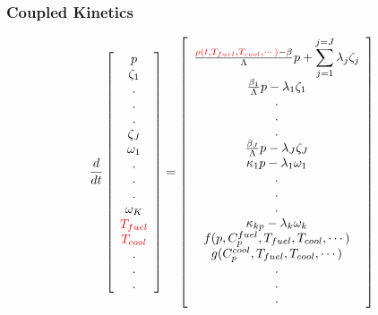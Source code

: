 \begin{frame}[fragile]
{  }
\end{frame}


\begin{frame}[fragile]
  \frametitle{Coupled Kinetics}
  \footnotesize{
\begin{equation} 
  \frac{d}{dt}\left[
    \begin{array}{c}
      p\\
      \zeta_1\\
      .\\
      .\\
      .\\
      \zeta_J\\
      \omega_1\\
      .\\
      .\\
      .\\
      \omega_K\\
      \textcolor{red}{T_{fuel}}\\
      \textcolor{red}{T_{cool}}\\
      .\\
      .\\
      .\\
    \end{array}
    \right]
    =
    \left[
      \begin{array}{ c }
        \frac{\textcolor{red}{\rho(t,T_{fuel},T_{cool},\cdots)}-\beta}{\Lambda}p + 
        \displaystyle\sum^{j=J}_{j=1}\lambda_j\zeta_j\\
        \frac{\beta_1}{\Lambda} p - \lambda_1\zeta_1\\
        .\\
        .\\
        .\\
        \frac{\beta_J}{\Lambda}p-\lambda_J\zeta_J\\
        \kappa_1p - \lambda_1\omega_1\\
        .\\
        .\\
        .\\
        \kappa_{k p} - \lambda_k\omega_{k}\\
        f(p, C_p^{fuel}, T_{fuel}, T_{cool},\cdots)\\
        g(C_p^{cool}, T_{fuel}, T_{cool},\cdots)\\
        .\\
        .\\
        .\\
      \end{array}
      \right]
      \label{eqn:ourPRKE}
    \end{equation}
  
  }
\end{frame}

